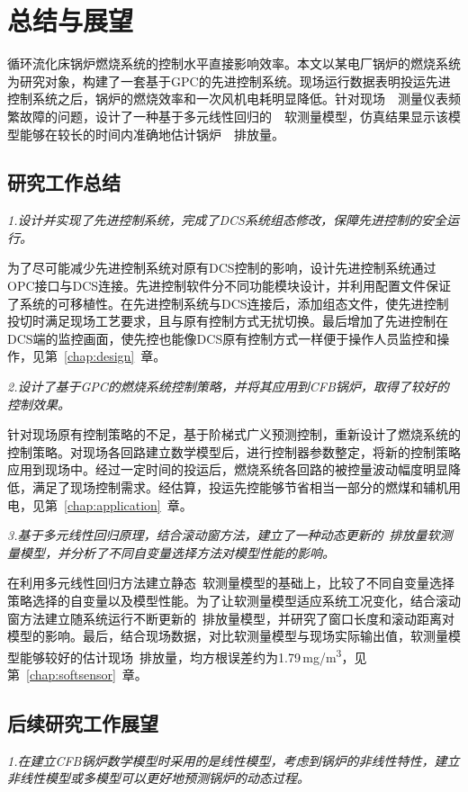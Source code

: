\chapter{总结与展望}

循环流化床锅炉燃烧系统的控制水平直接影响效率。本文以某电厂锅炉的燃烧系统为研究对象，构建了一套基于GPC的先进控制系统。现场运行数据表明投运先进控制系统之后，锅炉的燃烧效率和一次风机电耗明显降低。针对现场~~测量仪表频繁故障的问题，设计了一种基于多元线性回归的~~软测量模型，仿真结果显示该模型能够在较长的时间内准确地估计锅炉~~排放量。

\section{研究工作总结}


\emph{1.设计并实现了先进控制系统，完成了DCS系统组态修改，保障先进控制的安全运行。}

为了尽可能减少先进控制系统对原有DCS控制的影响，设计先进控制系统通过OPC接口与DCS连接。先进控制软件分不同功能模块设计，并利用配置文件保证了系统的可移植性。在先进控制系统与DCS连接后，添加组态文件，使先进控制投切时满足现场工艺要求，且与原有控制方式无扰切换。最后增加了先进控制在DCS端的监控画面，使先控也能像DCS原有控制方式一样便于操作人员监控和操作，见第~\ref{chap:design}~章。

\emph{2.设计了基于GPC的燃烧系统控制策略，并将其应用到CFB锅炉，取得了较好的控制效果。}

针对现场原有控制策略的不足，基于阶梯式广义预测控制，重新设计了燃烧系统的控制策略。对现场各回路建立数学模型后，进行控制器参数整定，将新的控制策略应用到现场中。经过一定时间的投运后，燃烧系统各回路的被控量波动幅度明显降低，满足了现场控制需求。经估算，投运先控能够节省相当一部分的燃煤和辅机用电，见第~\ref{chap:application}~章。

\emph{3.基于多元线性回归原理，结合滚动窗方法，建立了一种动态更新的~排放量软测量模型，并分析了不同自变量选择方法对模型性能的影响。}

在利用多元线性回归方法建立静态~软测量模型的基础上，比较了不同自变量选择策略选择的自变量以及模型性能。为了让软测量模型适应系统工况变化，结合滚动窗方法建立随系统运行不断更新的~排放量模型，并研究了窗口长度和滚动距离对模型的影响。最后，结合现场数据，对比软测量模型与现场实际输出值，软测量模型能够较好的估计现场~排放量，均方根误差约为1.79$\,$\si{mg/m^3}，见第~\ref{chap:softsensor}~章。


\section{后续研究工作展望}
\emph{1.在建立CFB锅炉数学模型时采用的是线性模型，考虑到锅炉的非线性特性，建立非线性模型或多模型可以更好地预测锅炉的动态过程。}


